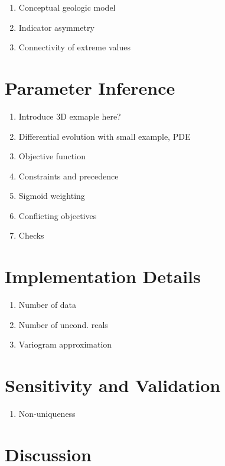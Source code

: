 \begin{enumerate}[noitemsep]
    \item Conceptual geologic model
    \item Indicator asymmetry
    \item Connectivity of extreme values
\end{enumerate}


\FloatBarrier
\section{Parameter Inference}
\label{sec:04paraminfer}

\begin{enumerate}[noitemsep]
    \item Introduce 3D exmaple here?
    \item Differential evolution with small example, PDE
    \item Objective function
    \item Constraints and precedence
    \item Sigmoid weighting
    \item Conflicting objectives
    \item Checks
\end{enumerate}


\FloatBarrier
\section{Implementation Details}
\label{sec:04implementd}

\begin{enumerate}[noitemsep]
    \item Number of data
    \item Number of uncond. reals
    \item Variogram approximation
\end{enumerate}


\FloatBarrier
\section{Sensitivity and Validation}
\label{sec:04valid}

\begin{enumerate}[noitemsep]
    \item Non-uniqueness
\end{enumerate}


\FloatBarrier
\section{Discussion}
\label{sec:04discuss}